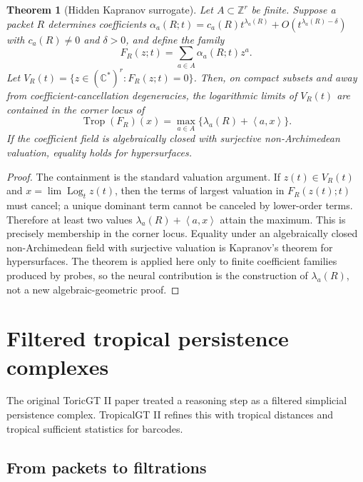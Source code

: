 \documentclass[11pt]{article}
\newtheorem{theorem}[definition]{Theorem}
\newcommand{\Z}{\mathbb{Z}}
\newcommand{\Log}{\operatorname{Log}}
\newcommand{\Trop}{\operatorname{Trop}}
\newcommand{\ip}[2]{\left\langle #1,#2\right\rangle}
\begin{document}
\begin{theorem}[Hidden Kapranov surrogate]
Let \(A\subset\Z^r\) be finite.  Suppose a packet \(R\) determines coefficients \(\alpha_a(R;t)=c_a(R)t^{\lambda_a(R)}+O(t^{\lambda_a(R)-\delta})\) with \(c_a(R)\ne0\) and \(\delta>0\), and define the family
\begin{equation}
F_R(z;t)=\sum_{a\in A}\alpha_a(R;t)z^a.
\end{equation}
Let \(V_R(t)=\{z\in(\mathbb C^*)^r:F_R(z;t)=0\}\).  Then, on compact subsets and away from coefficient-cancellation degeneracies, the logarithmic limits of \(V_R(t)\) are contained in the corner locus of
\begin{equation}
\Trop(F_R)(x)=\max_{a\in A}\{\lambda_a(R)+\ip{a}{x}\}.
\end{equation}
If the coefficient field is algebraically closed with surjective non-Archimedean valuation, equality holds for hypersurfaces.
\end{theorem}

\begin{proof}
The containment is the standard valuation argument.  If \(z(t)\in V_R(t)\) and \(x=\lim\Log_t z(t)\), then the terms of largest valuation in \(F_R(z(t);t)\) must cancel; a unique dominant term cannot be canceled by lower-order terms.  Therefore at least two values \(\lambda_a(R)+\ip{a}{x}\) attain the maximum.  This is precisely membership in the corner locus.  Equality under an algebraically closed non-Archimedean field with surjective valuation is Kapranov's theorem for hypersurfaces.  The theorem is applied here only to finite coefficient families produced by probes, so the neural contribution is the construction of \(\lambda_a(R)\), not a new algebraic-geometric proof.
\end{proof}

\section{Filtered tropical persistence complexes}\label{sec:persistence}

The original ToricGT II paper treated a reasoning step as a filtered simplicial persistence complex.  TropicalGT II refines this with tropical distances and tropical sufficient statistics for barcodes.

\subsection{From packets to filtrations}
\end{document}
